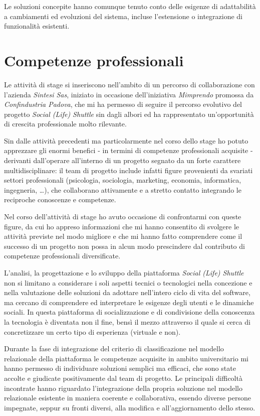 Le soluzioni concepite hanno comunque tenuto conto delle esigenze di adattabilità a cambiamenti ed evoluzioni del sistema, incluse l'estensione o integrazione di funzionalità esistenti.

\section{Competenze professionali}
Le attività di stage si inseriscono nell'ambito di un percorso di collaborazione con l'azienda \textit{Sintesi Sas}, iniziato in occasione dell'iniziativa \textit{Mimprendo} promossa da \textit{Confindustria Padova}, che mi ha permesso di seguire il percorso evolutivo del progetto \textit{Social (Life) Shuttle} sin dagli albori ed ha rappresentato un'opportunità di crescita professionale molto rilevante.

Sin dalle attività precedenti ma particolarmente nel corso dello stage ho potuto apprezzare gli enormi benefici - in termini di competenze professionali acquisite - derivanti dall'operare all'interno di un progetto segnato da un forte carattere multidisciplinare: il team di progetto include infatti figure provenienti da svariati settori professionali (psicologia, sociologia, marketing, economia, informatica, ingegneria, \ldots), che collaborano attivamente e a stretto contatto integrando le reciproche conoscenze e competenze.

Nel corso dell'attività di stage ho avuto occasione di confrontarmi con queste figure, da cui ho appreso informazioni che mi hanno consentito di svolgere le attività previste nel modo migliore e che mi hanno fatto comprendere come il successo di un progetto non possa in alcun modo prescindere dal contributo di competenze professionali diversificate.

L'analisi, la progettazione e lo sviluppo della piattaforma \textit{Social (Life) Shuttle} non si limitano a considerare i soli aspetti tecnici o tecnologici nella concezione e nella valutazione delle soluzioni da adottare nell'intero ciclo di vita del software, ma cercano di comprendere ed interpretare le esigenze degli utenti e le dinamiche sociali. In questa piattaforma di socializzazione e di condivisione della conoscenza la tecnologia è diventata non il fine, bensì il mezzo attraverso il quale si cerca di concretizzare un certo tipo di esperienza (virtuale e non).

Durante la fase di integrazione del criterio di classificazione nel modello relazionale della piattaforma le competenze acquisite in ambito universitario mi hanno permesso di individuare soluzioni semplici ma efficaci, che sono state accolte e giudicate positivamente dal team di progetto. Le principali difficoltà incontrate hanno riguardato l'integrazione della propria soluzione nel modello relazionale esistente in maniera coerente e collaborativa, essendo diverse persone impegnate, seppur su fronti diversi, alla modifica e all'aggiornamento dello stesso.

